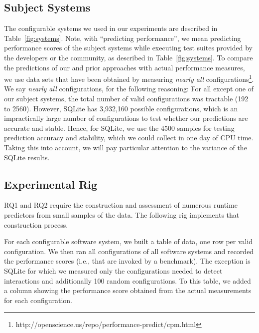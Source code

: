 \subsection{Subject Systems}
\label{sec:subject_systems}
The configurable systems we used in our experiments are described in Table~\ref{fig:systems}.
Note, with ``predicting performance'', we 
mean predicting performance scores of the subject systems while executing test suites provided by the developers or the community, as described in Table~\ref{fig:systems}.
To compare the predictions of our and prior approaches with actual performance measures, we use data sets that have been obtained by
measuring {\em nearly all} configurations\footnote{http://openscience.us/repo/performance-predict/cpm.html}.
We say {\em nearly all} configurations, for the following reasoning: For 
all except one of our subject systems, the total number of valid configurations
was tractable (192 to 2560). However,  SQLite has 3,932,160 
possible configurations, which is an impractically large number of configurations to test whether our predictions are accurate and stable. Hence, for SQLite, we use the 4500 samples for testing prediction accuracy and stability, which we could collect in one day of CPU time. Taking this into account, we will pay particular attention to the variance of the SQLite results.






\subsection{Experimental Rig}


RQ1 and RQ2 require the construction and assessment of numerous runtime predictors from small samples
of the data. The following rig implements that construction process.

For each configurable software system, we built a table of data, one row per valid configuration. We then ran all configurations of all software systems
and recorded the performance scores (i.e., that are invoked by a benchmark).
The exception is SQLite for which we measured only the
configurations needed to detect interactions and additionally
100 random configurations.  
To this table, we added a column showing the performance score obtained from the actual measurements for each configuration.

